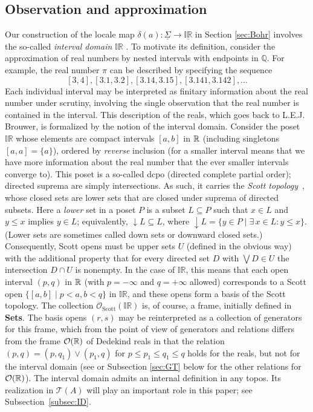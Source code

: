 \documentclass[11pt]{article}
\newcommand{\Q}{\mathbb{Q}}
\newcommand{\uIR}{\underline{\mathbb{IR}}}
\newcommand{\Sets}{\mbox{\textbf{Sets}}}
\newcommand{\raw}{\rightarrow} \newcommand{\rat}{\mapsto}
\newcommand{\dl}{\delta} \newcommand{\Dl}{\Delta}
\newcommand{\CO}{{\mathcal O}} \newcommand{\CP}{{\mathcal P}}
\newcommand{\alg}[1]{\ensuremath{#1}}
\newcommand{\functor}[1]{\ensuremath{\underline{#1}}}
\newcommand{\asstopos}{\ensuremath{\mathcal{T}}}
\newcommand{\TA}{\mathcal{T}(A)}
\newcommand{\ulS}{\functor{\Sigma}}
\renewcommand{\TA}{\asstopos(\alg{A})}
\begin{document}
\subsection{Observation and approximation}\label{subsec:AO}
Our construction of the locale map $\dl(a): \ulS\raw
\uIR$ in Section \ref{sec:Bohr} involves the so-called {\it interval domain}
$\mathbb{IR}$
\cite{scott:interval-domain}.
To motivate its definition, consider  the
approximation of real numbers by nested intervals with endpoints in $\Q$. For
example, the real number $\pi$ can be described by
specifying the sequence
\[
  [3,4],[3.1,3.2],[3.14,3.15],[3.141,3.142],\ldots
\]
Each individual interval may be interpreted as finitary information
about the real number under scrutiny, involving the single observation that the
real
number is contained in the interval. This description of the reals, which goes
back to L.E.J. Brouwer,
 is formalized by the notion of the interval domain. Consider the
 poset  $\mathbb{IR}$ whose  elements are compact intervals $[a,b]$ in ${\mathbb R}$  (including
singletons $[a,a]=\{a\}$),
  ordered by {\it reverse} inclusion (for a smaller interval means that we have
more information about the real number that the ever smaller intervals converge
to). This poset is a so-called dcpo (directed complete partial order); directed
suprema are simply intersections. As such, it carries the
{\it  Scott topology}~\cite{abramskyjung94,scott:interval-domain}, whose closed
sets are
lower sets that are closed under suprema of directed subsets. Here a {\it lower} set in a poset $P$
is a subset $L\subseteq P$ such that $x\in L$ and $y\leqslant x$ implies $y\in L$; equivalently,
$\downarrow\! L\subseteq L$, where $\downarrow\! L=\{y\in P\mid \exists\, x\in L: y\leqslant x\}$. (Lower sets are sometimes called down sets or downward closed sets.)
Consequently,
Scott opens must be upper sets $U$ (defined in the obvious way) with the additional property that  for every
directed set $D$ with $\bigvee D \in U$ the intersection $D\cap U$ is nonempty.
In the case of $\mathbb{IR}$, this means that
each open interval  $(p,q)$ in ${\mathbb R}$ (with $p=-\infty$ and $q=+\infty$ allowed)
corresponds to a Scott open $\{[a,b]\mid p<a, b<q\}$ in  $\mathbb{IR}$, and
these opens form a basis of  the Scott topology. The collection
$\CO_{\mathrm{Scott}}(\mathbb{IR})$ is, of course, a frame, initially defined in
\Sets. The basis opens $(r,s)$ may be reinterpreted as a collection of 
generators for this frame, which from the point of view of generators and relations differs from the frame
$\CO(\R)$ of Dedekind reals in that  the relation $(p,q)=(p,q_1)\vee (p_1,q)$ for $p\leqslant p_1\leqslant q_1\leqslant q$
holds for the reals, but not for the interval domain (see \cite[D4.7.4]{johnstone02b} or Subsection \ref{sec:GT} below
for the other relations for $\CO(\R)$). 
The interval domain admits an internal definition in any topos. Its
realization in $\TA$ will play an important role in this paper; see
Subsection~\ref{subsec:ID}.
\end{document}
